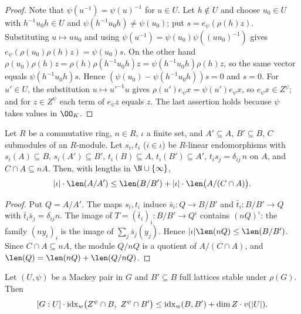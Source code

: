 \begin{proof}
Note that $\psi(u^{-1})=\psi(u)^{-1}$ for $u\in U$. Let $h\notin U$ and choose $u_0\in U$ with $h^{-1}u_0h\in U$
and $\psi(h^{-1}u_0h)\ne\psi(u_0)$; put $s=e_\psi(\rho(h)z)$. Substituting $u\mapsto uu_0$ and using
$\psi(u^{-1})=\psi(u_0)\psi((uu_0)^{-1})$ gives $e_\psi(\rho(u_0)\rho(h)z)=\psi(u_0)s$. On the other hand
$\rho(u_0)\rho(h)z=\rho(h)\rho(h^{-1}u_0h)z=\psi(h^{-1}u_0h)\rho(h)z$, so the same vector equals
$\psi(h^{-1}u_0h)s$. Hence $(\psi(u_0)-\psi(h^{-1}u_0h))s=0$ and $s=0$. For $u'\in U$, the substitution
$u\mapsto u'^{-1}u$ gives $\rho(u')e_\psi x=\psi(u')e_\psi x$, so $e_\psi x\in Z^\psi$; and for $z\in Z^\psi$ each
term of $e_\psi z$ equals $z$. The last assertion holds because $\psi$ takes values in $\OO_K$.
\end{proof}

\begin{lemma}\label{pf:onto3:ggcore}
Let $R$ be a commutative ring, $n\in R$, $\iota$ a finite set, and $A'\subseteq A$, $B'\subseteq B$, $C$
submodules of an $R$-module. Let $s_i,t_i$ ($i\in\iota$) be $R$-linear endomorphisms with $s_i(A)\subseteq B$,
$s_i(A')\subseteq B'$, $t_i(B)\subseteq A$, $t_i(B')\subseteq A'$, $t_is_j=\delta_{ij}\,n$ on $A$, and
$C\cap A\subseteq nA$. Then, with lengths in $\N\cup\{\infty\}$,
\[
|\iota|\cdot\len(A/A')\le\len(B/B')+|\iota|\cdot\len\bigl(A/(C\cap A)\bigr).
\]
\end{lemma}

\begin{proof}
Put $Q=A/A'$. The maps $s_i,t_i$ induce $\bar s_i\colon Q\to B/B'$ and $\bar t_i\colon B/B'\to Q$ with
$\bar t_i\bar s_j=\delta_{ij}n$. The image of $T=(\bar t_i)_i\colon B/B'\to Q^\iota$ contains $(nQ)^\iota$: the
family $(ny_i)_i$ is the image of $\sum_j\bar s_j(y_j)$. Hence $|\iota|\len(nQ)\le\len(B/B')$. Since $C\cap
A\subseteq nA$, the module $Q/nQ$ is a quotient of $A/(C\cap A)$, and $\len(Q)=\len(nQ)+\len(Q/nQ)$.
\end{proof}

\begin{lemma}\label{pf:onto3:GG}
Let $(U,\psi)$ be a Mackey pair in $G$ and $B'\subseteq B$ full lattices stable under $\rho(G)$. Then
\[
[G:U]\cdot\ontothreeidx_w\bigl(Z^\psi\cap B,\ Z^\psi\cap B'\bigr)\le\ontothreeidx_w(B,B')+\dim Z\cdot v(|U|).
\]
\end{lemma}

